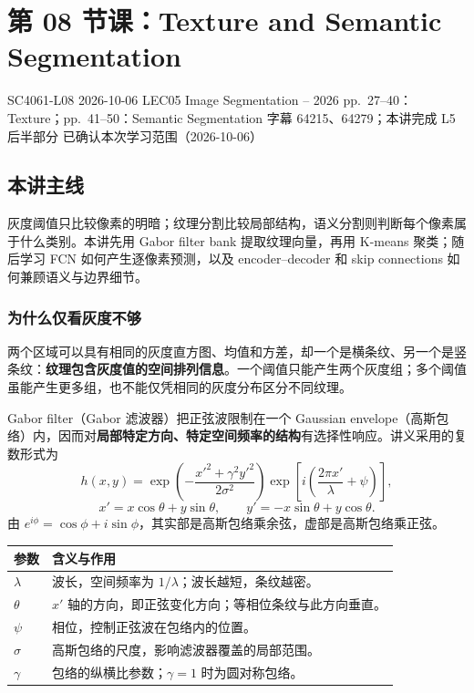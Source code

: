
\section{第 08 节课：Texture and Semantic Segmentation}
\label{lecture:SC4061-L08}

\lecturemeta
  {SC4061-L08}
  {2026-10-06}
  {LEC05 Image Segmentation -- 2026}
  {pp.~27--40：Texture；pp.~41--50：Semantic Segmentation}
  {字幕 64215、64279；本讲完成 L5 后半部分}
  {已确认本次学习范围（2026-10-06）}

\subsection{本讲主线}

灰度阈值只比较像素的明暗；纹理分割比较局部结构，语义分割则判断每个像素属于什么类别。本讲先用 Gabor filter bank 提取纹理向量，再用 K-means 聚类；随后学习 FCN 如何产生逐像素预测，以及 encoder--decoder 和 skip connections 如何兼顾语义与边界细节。


\subsubsection*{为什么仅看灰度不够}

两个区域可以具有相同的灰度直方图、均值和方差，却一个是横条纹、另一个是竖条纹：\textbf{纹理包含灰度值的空间排列信息}。一个阈值只能产生两个灰度组；多个阈值虽能产生更多组，也不能仅凭相同的灰度分布区分不同纹理。

Gabor filter（Gabor 滤波器）把正弦波限制在一个 Gaussian envelope（高斯包络）内，因而对\textbf{局部特定方向、特定空间频率的结构}有选择性响应。讲义采用的复数形式为
\[
  \boxed{h(x,y)=\exp\!\left(-\frac{x'^2+\gamma^2y'^2}{2\sigma^2}\right)
  \exp\!\left[i\left(\frac{2\pi x'}{\lambda}+\psi\right)\right]},
\]
\[
  x'=x\cos\theta+y\sin\theta,\qquad
  y'=-x\sin\theta+y\cos\theta.
\]
由 $e^{i\phi}=\cos\phi+i\sin\phi$，其实部是高斯包络乘余弦，虚部是高斯包络乘正弦。

\begin{center}
\begin{tabularx}{\textwidth}{@{}p{1.5cm}X@{}}
  \toprule
  参数 & 含义与作用 \\
  \midrule
  $\lambda$ & 波长，空间频率为 $1/\lambda$；波长越短，条纹越密。\\
  $\theta$ & $x'$ 轴的方向，即正弦变化方向；等相位条纹与此方向垂直。\\
  $\psi$ & 相位，控制正弦波在包络内的位置。\\
  $\sigma$ & 高斯包络的尺度，影响滤波器覆盖的局部范围。\\
  $\gamma$ & 包络的纵横比参数；$\gamma=1$ 时为圆对称包络。\\
  \bottomrule
\end{tabularx}
\end{center}

